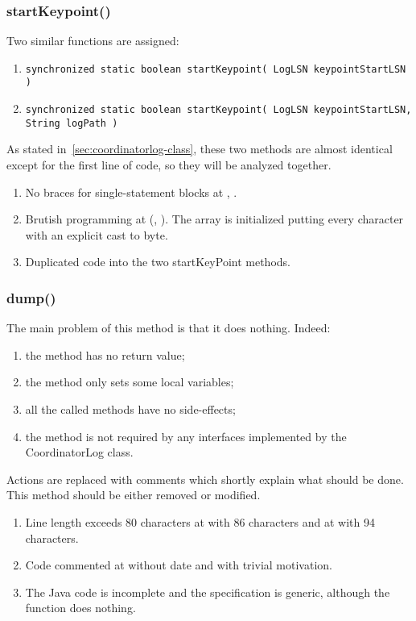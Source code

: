 \subsubsection{startKeypoint()}
Two similar functions are assigned:
\begin{enumerate}
    \item \texttt{\footnotesize synchronized static boolean startKeypoint( LogLSN keypointStartLSN )}
    \item \texttt{\footnotesize synchronized static boolean startKeypoint( LogLSN keypointStartLSN, String logPath )}
\end{enumerate}

As stated in~\autoref{sec:coordinatorlog-class}, these two methods are almost identical except for the first line of code, so they will be analyzed together.

\begin{enumerate}
    \item {} No braces for single-statement blocks at , .
    \item {} Brutish programming at (, ). The array is initialized putting every character with an explicit cast to byte.
    \item {} Duplicated code into the two startKeyPoint methods.
\end{enumerate}


\subsubsection{dump()}
The main problem of this method is that it does nothing.
Indeed:
\begin{enumerate}
    \item the method has no return value;
    \item the method only sets some local variables;
    \item all the called methods have no side-effects;
    \item the method is not required by any interfaces implemented by the CoordinatorLog class.
\end{enumerate}
Actions are replaced with comments which shortly explain what should be done.
This method should be either removed or modified.
\begin{enumerate}
	\item {} Line length exceeds 80 characters at  with 86 characters and at  with 94 characters.
	\item {} Code commented at  without date and with trivial motivation.
	\item {} The Java code is incomplete and the specification is generic, although the function does nothing.
\end{enumerate}

